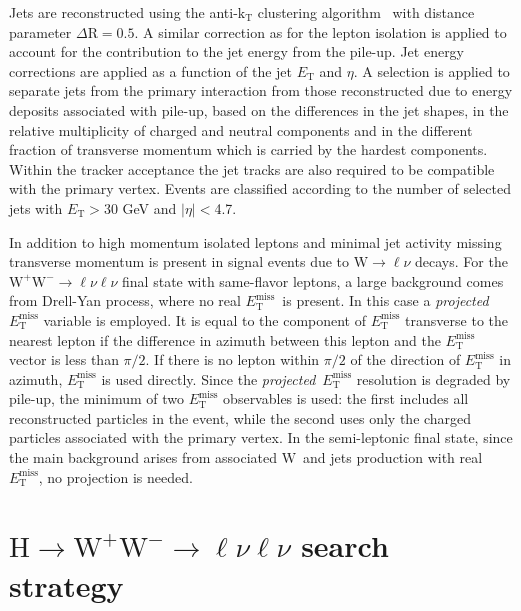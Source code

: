 \documentclass{PoS}
\newcommand{\Hi}{\ensuremath{\mathrm{H}}}
\newcommand{\W}{\ensuremath{\mathrm{W}}}
\newcommand{\WW}{\ensuremath{\W^+\W^-}}
\newcommand{\ETm}{\ensuremath{E_{\mathrm{T}}^{\mathrm{miss}}}}
\newcommand{\MET}{\ETm}
\newcommand{\Et}{\ensuremath{E_\mathrm{T}}}
\begin{document}
Jets are reconstructed using the anti-$\mathrm{k_T}$ clustering
algorithm~\cite{antikt} with distance parameter $\Delta
\mathrm{R}=0.5$.  A similar
correction as for the lepton isolation is applied to account for the
contribution to the jet energy from the pile-up. Jet energy
corrections are applied as a function of the jet $\Et$ and
$\eta$.  A selection is applied to separate jets from
the primary interaction from those reconstructed due to energy
deposits associated with pile-up, based on the differences in the jet
shapes, in the relative multiplicity of charged and neutral components
and in the different fraction of transverse momentum which is carried
by the hardest components.  Within the tracker acceptance the jet
tracks are also required to be compatible with the primary
vertex. Events are classified according to the number of selected jets
with $\Et>30$ GeV and $|\eta|<$4.7.

In addition to high momentum isolated leptons and minimal jet activity
missing transverse momentum is present in signal events due to
$\W\to\ell\nu$ decays.  For the $\WW\to\ell\nu\ell\nu$ final state
with same-flavor leptons, a large background comes from Drell-Yan
process, where no real \MET\ is present. In this case a
\textit{projected}~$\MET$ variable is employed. It is equal to the
component of $\MET$ transverse to the nearest lepton if the difference
in azimuth between this lepton and the $\MET$ vector is less than
$\pi/2$. If there is no lepton within $\pi/2$ of the direction of
$\MET$ in azimuth, $\MET$ is used directly.  Since the
\textit{projected}~$\MET$ resolution is degraded by pile-up, the
minimum of two $\MET$ observables is used: the first includes all
reconstructed particles in the event, while the second uses only the
charged particles associated with the primary vertex.  In the
semi-leptonic final state, since the main background arises from
associated \W\ and jets production with real \MET, no projection is
needed.


\section{$\Hi \to \WW \to \ell\nu\ell\nu$ search strategy}
\label{sec:hww2l2nu}
\end{document}
